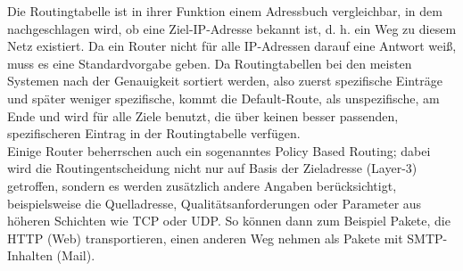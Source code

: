 Die Routingtabelle ist in ihrer Funktion einem Adressbuch vergleichbar, in dem nachgeschlagen wird, ob eine Ziel-IP-Adresse bekannt ist, d. h. ein Weg zu diesem Netz existiert. Da ein Router nicht für alle IP-Adressen darauf eine Antwort weiß, muss es eine Standardvorgabe geben. Da Routingtabellen bei den meisten Systemen nach der Genauigkeit sortiert werden, also zuerst spezifische Einträge und später weniger spezifische, kommt die Default-Route, als unspezifische, am Ende und wird für alle Ziele benutzt, die über keinen besser passenden, spezifischeren Eintrag in der Routingtabelle verfügen.\\

Einige Router beherrschen auch ein sogenanntes Policy Based Routing; dabei wird die Routingentscheidung nicht nur auf Basis der Zieladresse (Layer-3) getroffen, sondern es werden zusätzlich andere Angaben berücksichtigt, beispielsweise die Quelladresse, Qualitätsanforderungen oder Parameter aus höheren Schichten wie TCP oder UDP. So können dann zum Beispiel Pakete, die HTTP (Web) transportieren, einen anderen Weg nehmen als Pakete mit SMTP-Inhalten (Mail).
